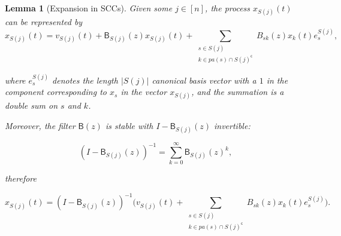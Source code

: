 \documentclass{statsoc}
\newcounter{lemma}
\def\B{\mathsf{B}}  %
\newcommand{\pa}[1]{pa(#1)}  %
\newtheorem{lemma}{Lemma}
\def\c{\mathsf{c}}  %
\begin{document}
\begin{lemma}[Expansion in SCCs]
  \label{lem:scc_expansion}
  Given some $j \in [n]$, the process $x_{S(j)}(t)$ can be represented
  by
  \begin{equation}
    \label{eqn:scc_parent_expansion}
    x_{S(j)}(t) = v_{S(j)}(t) + \B_{S(j)}(z)x_{S(j)}(t) + \sum_{\substack{s \in S(j) \\ k \in \pa{s} \cap S(j)^\c}} B_{sk}(z)x_k(t)e_s^{S(j)},
  \end{equation}

  where $e_s^{S(j)}$ denotes the length $|S(j)|$ canonical basis
  vector with a $1$ in the component corresponding to $x_s$ in the
  vector $x_{S(j)}$, and the summation is a double sum on $s$ and $k$.

  Moreover, the filter $\B(z)$ is stable with $I - \B_{S(j)}(z)$
  invertible:

  \begin{equation}
    \label{eqn:scc_inversion}
    (I - \B_{S(j)}(z))^{-1} = \sum_{k = 0}^\infty \B_{S(j)}(z)^k,
  \end{equation}

  therefore

  \begin{equation}
    \label{eqn:scc_parent_expansion_inverted}
    x_{S(j)}(t) = (I - \B_{S(j)}(z))^{-1} \big(v_{S(j)}(t) + \sum_{\substack{s \in S(j) \\ k \in \pa{s} \cap S(j)^\c}} B_{sk}(z)x_k(t)e_s^{S(j)}\big).
  \end{equation}
  
\end{lemma}
\end{document}
